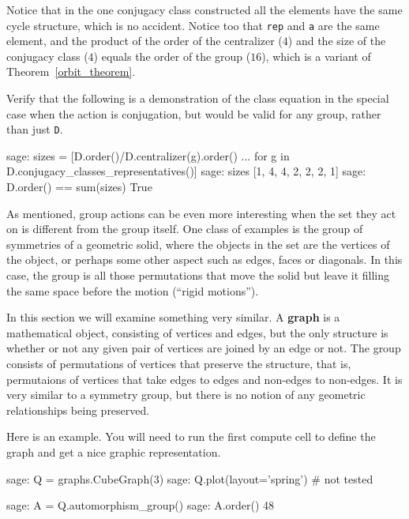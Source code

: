 %
Notice that in the one conjugacy class constructed all the elements have the same cycle structure, which is no accident.  Notice too that \verb?rep? and \verb?a? are the same element, and the product of the order of the centralizer ($4$) and the size of the conjugacy class ($4$) equals the order of the group ($16$), which is a variant of Theorem~\ref{orbit_theorem}.\par
%
Verify that the following is a demonstration of the class equation in the special case when the action is conjugation, but would be valid for any group, rather than just \verb?D?.
%
\begin{sageexample}
sage: sizes = [D.order()/D.centralizer(g).order()
...                for g in D.conjugacy_classes_representatives()]
sage: sizes
[1, 4, 4, 2, 2, 2, 1]
sage: D.order() == sum(sizes)
True
\end{sageexample}
%
%
As mentioned, group actions can be even more interesting when the set they act on is different from the group itself.  One class of examples is the group of symmetries of a geometric solid, where the objects in the set are the vertices of the object, or perhaps some other aspect such as edges, faces or diagonals.  In this case, the group is all those permutations that move the solid but leave it filling the same space before the motion (``rigid motions'').\par
%
In this section we will examine something very similar.  A {\bf graph} is a mathematical object, consisting of vertices and edges, but the only structure is whether or not any given pair of vertices are joined by an edge or not.  The group consists of permutations of vertices that preserve the structure, that is, permutaions of vertices that take edges to edges and non-edges to non-edges.  It is very similar to a symmetry group, but there is no notion of any geometric relationships being preserved.\par
%
Here is an example.  You will need to run the first compute cell to define the graph and get a nice graphic representation.
%
\begin{sageexample}
sage: Q = graphs.CubeGraph(3)
sage: Q.plot(layout='spring')      # not tested
\end{sageexample}
%
\begin{sageexample}
sage: A = Q.automorphism_group()
sage: A.order()
48
\end{sageexample}
%
